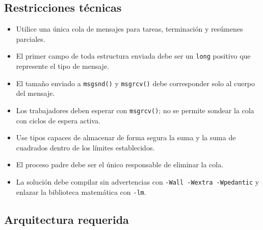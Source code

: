 \documentclass[12pt,a4paper]{article}
\begin{document}
\subsection*{Restricciones técnicas}
\begin{itemize}[itemsep=0.25em]
    \item Utilice una única cola de mensajes para tareas, terminación y resúmenes parciales.
    \item El primer campo de toda estructura enviada debe ser un \texttt{long} positivo que represente el tipo de mensaje.
    \item El tamaño enviado a \texttt{msgsnd()} y \texttt{msgrcv()} debe corresponder solo al cuerpo del mensaje.
    \item Los trabajadores deben esperar con \texttt{msgrcv()}; no se permite sondear la cola con ciclos de espera activa.
    \item Use tipos capaces de almacenar de forma segura la suma y la suma de cuadrados dentro de los límites establecidos.
    \item El proceso padre debe ser el único responsable de eliminar la cola.
    \item La solución debe compilar sin advertencias con \texttt{-Wall -Wextra -Wpedantic} y enlazar la biblioteca matemática con \texttt{-lm}.
\end{itemize}

\subsection*{Arquitectura requerida}
\end{document}
